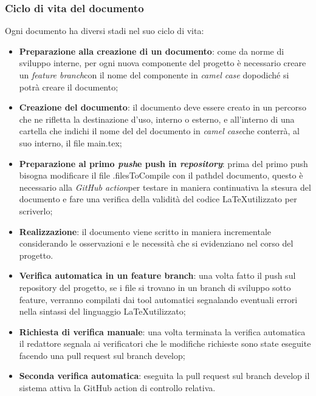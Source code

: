   \subsubsection{Ciclo di vita del documento}
  Ogni documento ha diversi stadi nel suo ciclo di vita:
  \begin{itemize}
    \item \textbf{Preparazione alla creazione di un documento}: come da norme di
    sviluppo interne, per ogni nuova componente del progetto \`e necessario creare un
    \textit{feature branch}\glo con il nome del componente in \textit{camel case}\glo
    dopodich\'e si potr\`a creare il documento;

    \item \textbf{Creazione del documento}: il documento deve essere creato in un
    percorso che ne rifletta la destinazione d'uso, interno o esterno, e
    all'interno di una cartella che indichi il nome del del documento in
    \textit{camel case}\glo che conterr\`a, al suo interno, il file main.tex;

    \item \textbf{Preparazione al primo \textit{push}\glo e push in \textit{repository}\glo}:
    prima del primo push bisogna modificare il file .filesToCompile con il path\glo del documento,
     questo \`e necessario alla \textit{GitHub action}\glo per testare in maniera continuativa
     la stesura del documento e fare una verifica della validit\`a del codice
     \LaTeX \space utilizzato per scriverlo;

    \item \textbf{Realizzazione}: il documento viene scritto in maniera incrementale
    considerando le osservazioni e le necessit\`a che si evidenziano nel corso del
    progetto.

    \item \textbf{Verifica automatica in un feature branch}: una volta fatto il push
    sul repository del progetto, se i file si trovano in un branch di sviluppo
    sotto feature, verranno compilati dai tool automatici segnalando eventuali errori
    nella sintassi del linguaggio \LaTeX \space utilizzato;

    \item \textbf{Richiesta di verifica manuale}: una volta terminata la verifica
    automatica il redattore segnala ai verificatori che le modifiche richieste
    sono state eseguite facendo una pull request sul branch develop;

    \item \textbf{Seconda verifica automatica}: eseguita la pull request sul branch
    develop il sistema attiva la GitHub action di controllo relativa.


\end{itemize}
